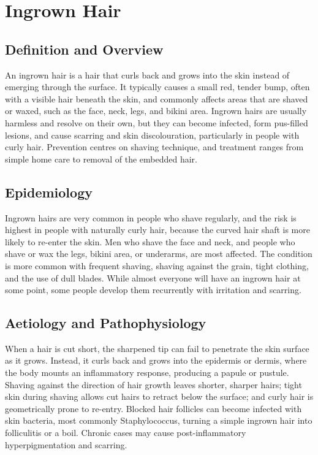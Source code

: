 \chapter{Ingrown Hair}

\section*{Definition and Overview}
An ingrown hair is a hair that curls back and grows into the skin instead of emerging through the surface. It typically causes a small red, tender bump, often with a visible hair beneath the skin, and commonly affects areas that are shaved or waxed, such as the face, neck, legs, and bikini area. Ingrown hairs are usually harmless and resolve on their own, but they can become infected, form pus-filled lesions, and cause scarring and skin discolouration, particularly in people with curly hair. Prevention centres on shaving technique, and treatment ranges from simple home care to removal of the embedded hair.

\section*{Epidemiology}
Ingrown hairs are very common in people who shave regularly, and the risk is highest in people with naturally curly hair, because the curved hair shaft is more likely to re-enter the skin. Men who shave the face and neck, and people who shave or wax the legs, bikini area, or underarms, are most affected. The condition is more common with frequent shaving, shaving against the grain, tight clothing, and the use of dull blades. While almost everyone will have an ingrown hair at some point, some people develop them recurrently with irritation and scarring.

\section*{Aetiology and Pathophysiology}
When a hair is cut short, the sharpened tip can fail to penetrate the skin surface as it grows. Instead, it curls back and grows into the epidermis or dermis, where the body mounts an inflammatory response, producing a papule or pustule. Shaving against the direction of hair growth leaves shorter, sharper hairs; tight skin during shaving allows cut hairs to retract below the surface; and curly hair is geometrically prone to re-entry. Blocked hair follicles can become infected with skin bacteria, most commonly Staphylococcus, turning a simple ingrown hair into folliculitis or a boil. Chronic cases may cause post-inflammatory hyperpigmentation and scarring.

